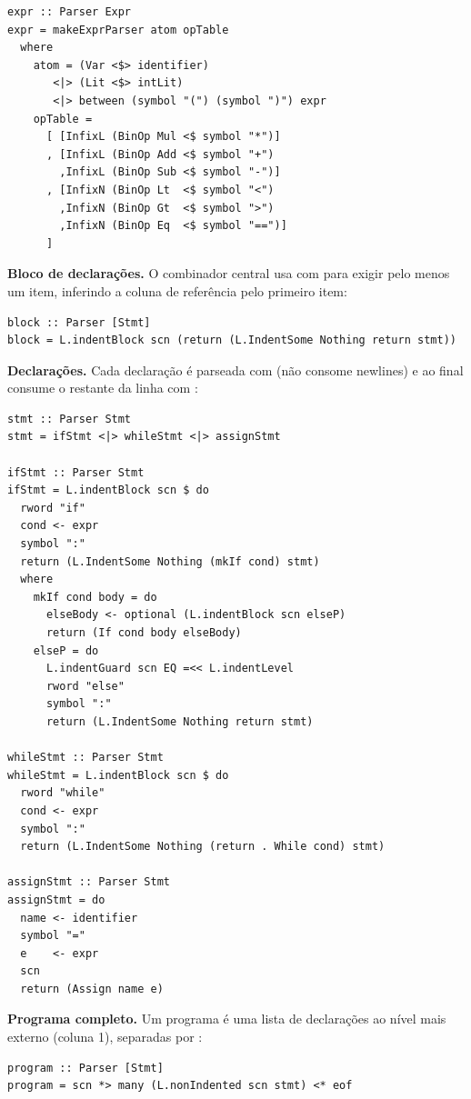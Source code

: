 \begin{verbatim}
expr :: Parser Expr
expr = makeExprParser atom opTable
  where
    atom = (Var <$> identifier)
       <|> (Lit <$> intLit)
       <|> between (symbol "(") (symbol ")") expr
    opTable =
      [ [InfixL (BinOp Mul <$ symbol "*")]
      , [InfixL (BinOp Add <$ symbol "+")
        ,InfixL (BinOp Sub <$ symbol "-")]
      , [InfixN (BinOp Lt  <$ symbol "<")
        ,InfixN (BinOp Gt  <$ symbol ">")
        ,InfixN (BinOp Eq  <$ symbol "==")]
      ]
\end{verbatim}

\textbf{Bloco de declarações.} O combinador central usa
 com  para exigir pelo
menos um item, inferindo a coluna de referência pelo primeiro item:

\begin{verbatim}
block :: Parser [Stmt]
block = L.indentBlock scn (return (L.IndentSome Nothing return stmt))
\end{verbatim}

\textbf{Declarações.} Cada declaração é parseada com
 (não consome newlines) e ao final consume o restante
da linha com :

\begin{verbatim}
stmt :: Parser Stmt
stmt = ifStmt <|> whileStmt <|> assignStmt

ifStmt :: Parser Stmt
ifStmt = L.indentBlock scn $ do
  rword "if"
  cond <- expr
  symbol ":"
  return (L.IndentSome Nothing (mkIf cond) stmt)
  where
    mkIf cond body = do
      elseBody <- optional (L.indentBlock scn elseP)
      return (If cond body elseBody)
    elseP = do
      L.indentGuard scn EQ =<< L.indentLevel
      rword "else"
      symbol ":"
      return (L.IndentSome Nothing return stmt)

whileStmt :: Parser Stmt
whileStmt = L.indentBlock scn $ do
  rword "while"
  cond <- expr
  symbol ":"
  return (L.IndentSome Nothing (return . While cond) stmt)

assignStmt :: Parser Stmt
assignStmt = do
  name <- identifier
  symbol "="
  e    <- expr
  scn
  return (Assign name e)
\end{verbatim}

\textbf{Programa completo.} Um programa é uma lista de declarações
ao nível mais externo (coluna 1), separadas por :

\begin{verbatim}
program :: Parser [Stmt]
program = scn *> many (L.nonIndented scn stmt) <* eof
\end{verbatim}

